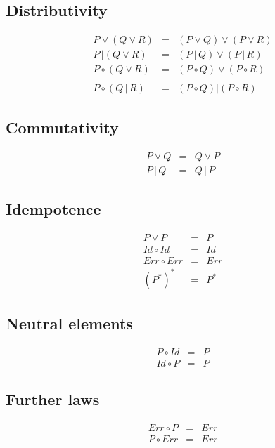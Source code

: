 \subsection{Distributivity}
\begin{eqnarray*}
  P \vee \left( Q \vee R \right) & = & \left( P \vee Q \right) \vee \left( P \vee R \right) \\
  P \,| \left( Q \vee R \right) & = & \left( P \,|\, Q \right) \vee \left( P \,|\, R \right) \\
  P \circ \left( Q \vee R \right) & = & \left( P \circ Q \right) \vee \left( P \circ R \right) \\
  & & \\
  P \circ \left( Q \,|\, R \right) & = & \left( P \circ Q \right) | \left( P \circ R \right)
\end{eqnarray*}

\subsection{Commutativity}
\begin{eqnarray*}
  P \vee Q & = & Q \vee P \\
  P \,|\, Q & = & Q \,|\, P
\end{eqnarray*}

\subsection{Idempotence}
\begin{eqnarray*}
  P \vee P & = & P \\
  Id \circ Id & = & Id \\
  Err \circ Err & = & Err \\
  (P^*)^* & = & P^*
\end{eqnarray*}

\subsection{Neutral elements}
\begin{eqnarray*}
  P \circ Id & = & P \\
  Id \circ P & = & P
\end{eqnarray*}

\subsection{Further laws}
\begin{eqnarray*}
  Err \circ P & = & Err \\
  P \circ Err & = & Err
\end{eqnarray*}